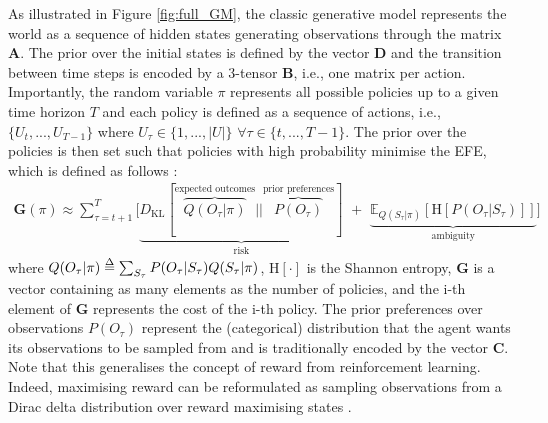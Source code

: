 \documentclass[twoside,11pt]{article}
\def\delequal{\mathrel{\ensurestackMath{\stackon[1pt]{=}{\scriptstyle\Delta}}}}
\begin{document}
As illustrated in Figure \ref{fig:full_GM}, the classic generative model represents the world as a sequence of hidden states generating observations through the matrix $\bm{A}$. The prior over the initial states is defined by the vector $\bm{D}$ and the transition between time steps is encoded by a 3-tensor $\bm{B}$, i.e., one matrix per action. Importantly, the random variable $\pi$ represents all possible policies up to a given time horizon $T$ and each policy is defined as a sequence of actions, i.e., $\{U_t, ..., U_{T - 1}\}$ where $U_\tau \in \{1, ..., |U|\} \,\, \forall \tau \in \{t, ..., T - 1\}$. The prior over the policies is then set such that policies with high probability minimise the EFE, which is defined as follows \citep{Parr2019}:
\begin{align}\label{eq:1}
\bm{G}(\pi) \approx \sum_{\tau=t + 1}^T \Bigg[ \underbrace{D_{\mathrm{KL}}[\overbrace{Q(O_\tau|\pi)}^{\text{expected outcomes}}||\overbrace{P(O_\tau)}^{\text{prior preferences}}]}_{\text{risk}}\,\, +\,\, \underbrace{\mathbb{E}_{Q(S_\tau|\pi)}[\text{H}[P(O_\tau | S_\tau)]]}_{\text{ambiguity}}\Bigg]
\end{align}
where $Q(O_{\tau}|\pi) \delequal \sum_{S_\tau} P(O_\tau|S_\tau)Q(S_\tau|\pi)$, $\text{H}[\cdot]$ is the Shannon entropy, $\bm{G}$ is a vector containing as many elements as the number of policies, and the i-th element of $\bm{G}$ represents the cost of the i-th policy. The prior preferences over observations $P(O_\tau)$ represent the (categorical) distribution that the agent wants its observations to be sampled from and is traditionally encoded by the vector $\bm{C}$. Note that this generalises the concept of reward from reinforcement learning. Indeed, maximising reward can be reformulated as sampling observations from a Dirac delta distribution over reward maximising states \citep{dacosta2020relationship}.
\end{document}
